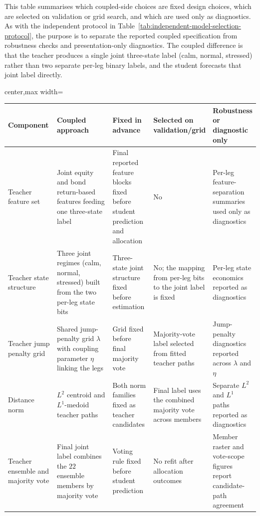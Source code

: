 This table summarises which coupled-side choices are fixed design choices, which are selected on
validation or grid search, and which are used only as diagnostics. As with the independent
protocol in Table~\ref{tab:independent-model-selection-protocol}, the purpose is to separate the
reported coupled specification from robustness checks and presentation-only diagnostics. The
coupled difference is that the teacher produces a single joint three-state label (calm, normal,
stressed) rather than two separate per-leg binary labels, and the student forecasts that joint
label directly.

\begin{table}[H]
\centering
\small
\begin{adjustbox}{center,max width=\linewidth}
\begin{tabular}{p{0.20\linewidth}p{0.30\linewidth}p{0.17\linewidth}p{0.18\linewidth}p{0.18\linewidth}}
\toprule
Component & Coupled approach & Fixed in advance & Selected on validation/grid & Robustness or diagnostic only \\
\midrule
Teacher feature set & Joint equity and bond return-based features feeding one three-state label & Final reported feature blocks fixed before student prediction and allocation & No & Per-leg feature-separation summaries used only as diagnostics \\
Teacher state structure & Three joint regimes (calm, normal, stressed) built from the two per-leg state bits & Three-state joint structure fixed before estimation & No; the mapping from per-leg bits to the joint label is fixed & Per-leg state economics reported as diagnostics \\
Teacher jump penalty grid & Shared jump-penalty grid $\lambda$ with coupling parameter $\eta$ linking the legs & Grid fixed before final majority vote & Majority-vote label selected from fitted teacher paths & Jump-penalty diagnostics reported across $\lambda$ and $\eta$ \\
Distance norm & $L^2$ centroid and $L^1$-medoid teacher paths & Both norm families fixed as teacher candidates & Final label uses the combined majority vote across members & Separate $L^2$ and $L^1$ paths reported as diagnostics \\
Teacher ensemble and majority vote & Final joint label combines the $22$ ensemble members by majority vote & Voting rule fixed before student prediction & No refit after allocation outcomes & Member raster and vote-scope figures report candidate-path agreement \\

\end{tabular}
\end{adjustbox}
\end{table}
